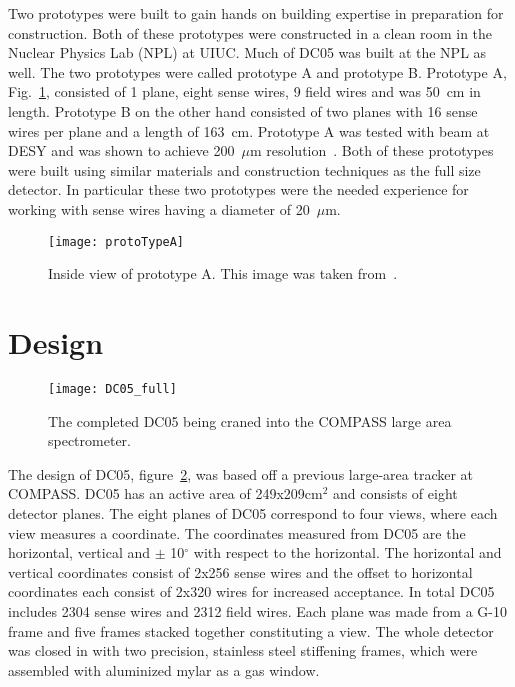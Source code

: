 Two prototypes were built to gain hands on building expertise in preparation for
construction.  Both of these prototypes were constructed in a clean room in the
Nuclear Physics Lab (NPL) at UIUC.  Much of DC05 was built at the NPL as well.
The two prototypes were called prototype A and prototype B.  Prototype A,
Fig.~\ref{fig::protoTypeA}, consisted of 1 plane, eight sense wires, 9 field
wires and was 50~cm in length.  Prototype B on the other hand consisted of two
planes with 16 sense wires per plane and a length of 163~cm.  Prototype A was
tested with beam at DESY and was shown to achieve 200~$\mu$m
resolution~\cite{choi}.  Both of these prototypes were built using similar
materials and construction techniques as the full size detector.  In particular
these two prototypes were the needed experience for working with sense wires
having a diameter of 20~$\mu$m.

\begin{figure}[h!t]
  \centering \texttt{[image: protoTypeA]}
  \caption{Inside view of prototype A.  This image was taken from~\cite{choi}. }
  \label{fig::protoTypeA}
\end{figure}


\section{Design}

\begin{figure}
  \centering \texttt{[image: DC05\_full]}
  \caption{}{The completed DC05 being craned into the COMPASS large area
    spectrometer.}
  \label{fig:DC05}%
\end{figure}

The design of DC05, figure~\ref{fig:DC05}, was based off a previous large-area
tracker at COMPASS.  DC05 has an active area of 249x209cm$^2$ and consists of
eight detector planes.  The eight planes of DC05 correspond to four views, where
each view measures a coordinate.  The coordinates measured from DC05 are the
horizontal, vertical and $\pm$ 10$^{\circ}$ with respect to the horizontal.  The
horizontal and vertical coordinates consist of 2x256 sense wires and the offset
to horizontal coordinates each consist of 2x320 wires for increased acceptance.
In total DC05 includes 2304 sense wires and 2312 field wires.  Each plane was
made from a G-10 frame and five frames stacked together constituting a view.
The whole detector was closed in with two precision, stainless steel stiffening
frames, which were assembled with aluminized mylar as a gas window.

